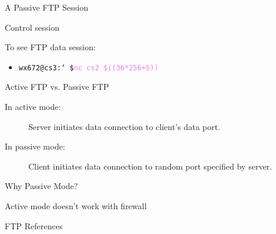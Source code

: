             
\begin{frame}{A Passive FTP Session}
  \begin{iblock}{Control session}
    \begin{center}
    \end{center}
  \end{iblock}
  \begin{iblock}{To see FTP data session:}
    \begin{itemize}
    \item[] \texttt{wx672@cs3:\char`~\$}\quad\textcolor{violet}{\texttt{nc cs2 \$((36*256+5))}}
    \end{itemize}
  \end{iblock}
\end{frame}

\begin{frame}{Active FTP vs. Passive FTP}
  \begin{description}
  \item[In active mode:] Server initiates data connection to client's data port.
  \item[In passive mode:] Client initiates data connection to random port specified by
    server.
  \end{description}
\end{frame}

\begin{frame}{Why Passive Mode?}
  \begin{iblock}{Active mode doesn't work with firewall}
    \begin{center}
    \end{center}
  \end{iblock}
\end{frame}

\begin{frame}{FTP References}
  \begin{refsection}
    \nocite{wiki:ftp, rfc959,rfc1579}
    \printbibliography[heading=none]
  \end{refsection}
\end{frame}

